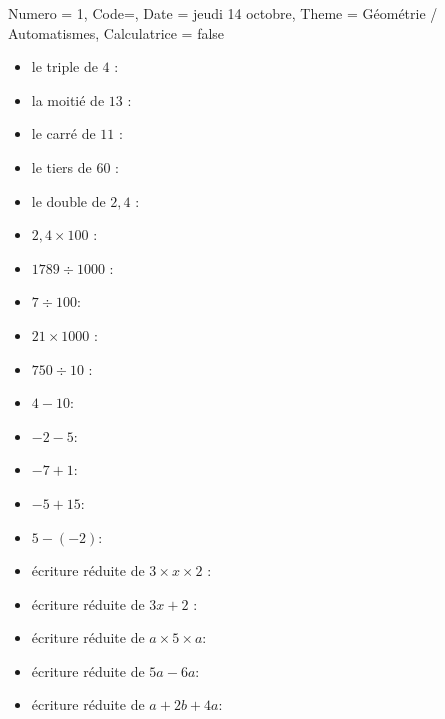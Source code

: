 \documentclass[11pt]{article}
\newcommand{\ligne}{{\color{gray!60}\hrulefill}}
\begin{document}
\begin{Maquette}[IE]{
        Numero = 1, Code={}, Date = jeudi 14 octobre, Theme = Géométrie / Automatismes, Calculatrice = false
    }
    \vspace{.5cm}
    \begin{exercice}
        \begin{multicols}{2}
            \begin{itemize}[itemsep=10pt]
                \item le triple de $4$ : \ligne
                \item la moitié de $13$ : \ligne
                \item le carré de $11$ : \ligne
                \item le tiers de $60$ : \ligne
                \item le double de $2,4$ : \ligne
                \item $2,4 \times 100$ : \ligne
                \item $1789 \div 1000$ : \ligne
                \item $7 \div 100$: \ligne
                \item $21 \times 1000$ : \ligne
                \item $750 \div 10$ : \ligne
                \item $4-10$: \ligne
                \item $-2-5$: \ligne
                \item $-7+1$: \ligne
                \item $-5+15$: \ligne
                \item $5 - (-2)$: \ligne
                \item écriture réduite de $3 \times x \times 2 $ : \ligne
                \item écriture réduite de $3 x + 2$ : \ligne
                \item écriture réduite de $a \times 5 \times a$: \ligne
                \item écriture réduite de $5a - 6a$: \ligne
                \item écriture réduite de $a+2b+4a$: \ligne
            \end{itemize}
        \end{multicols}
    \end{exercice}
\end{Maquette}
\end{document}
